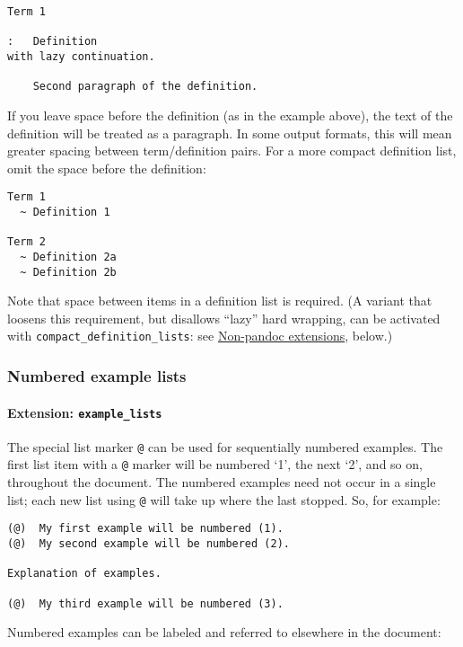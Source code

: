 \documentclass[]{article}
\let\oldparagraph\paragraph
\renewcommand{\paragraph}[1]{\oldparagraph{#1}\mbox{}}
\begin{document}
\begin{verbatim}
Term 1

:   Definition
with lazy continuation.

    Second paragraph of the definition.
\end{verbatim}

If you leave space before the definition (as in the example above), the
text of the definition will be treated as a paragraph. In some output
formats, this will mean greater spacing between term/definition pairs.
For a more compact definition list, omit the space before the
definition:

\begin{verbatim}
Term 1
  ~ Definition 1

Term 2
  ~ Definition 2a
  ~ Definition 2b
\end{verbatim}

Note that space between items in a definition list is required. (A
variant that loosens this requirement, but disallows ``lazy'' hard
wrapping, can be activated with \texttt{compact\_definition\_lists}: see
\protect\hyperlink{non-pandoc-extensions}{Non-pandoc extensions},
below.)

\subsubsection{Numbered example lists}\label{numbered-example-lists}

\paragraph{\texorpdfstring{Extension:
\texttt{example\_lists}}{Extension: example\_lists}}\label{extension-example_lists}

The special list marker \texttt{@} can be used for sequentially numbered
examples. The first list item with a \texttt{@} marker will be numbered
`1', the next `2', and so on, throughout the document. The numbered
examples need not occur in a single list; each new list using \texttt{@}
will take up where the last stopped. So, for example:

\begin{verbatim}
(@)  My first example will be numbered (1).
(@)  My second example will be numbered (2).

Explanation of examples.

(@)  My third example will be numbered (3).
\end{verbatim}

Numbered examples can be labeled and referred to elsewhere in the
document:
\end{document}
